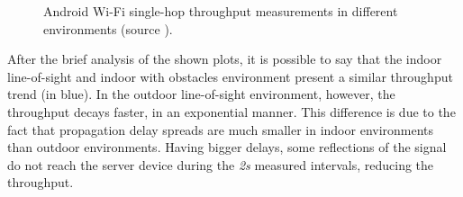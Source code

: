 \begin{figure}[ht]
	\centering
	\par\medskip
	\par\medskip        
	\caption{Android Wi-Fi single-hop throughput measurements in different environments (source \cite{throughputpaper}).}
	\label{fig:wfthroughput}
\end{figure}

After the brief analysis of the shown plots, it is possible to say that the indoor line-of-sight and indoor with obstacles environment present a similar throughput trend (in blue). In the outdoor line-of-sight environment, however, the throughput decays faster, in an exponential manner. This difference is due to the fact that propagation delay spreads are much smaller in indoor environments than outdoor environments. Having bigger delays, some reflections of the signal do not reach the server device during the \textit{2s} measured intervals, reducing the throughput.

